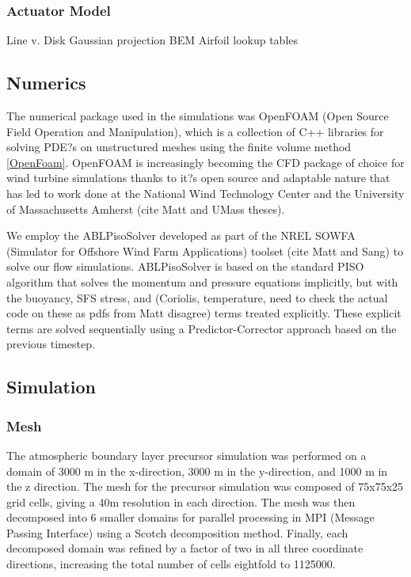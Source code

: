 \documentclass[12pt,letterpaper]{article}
\begin{document}
\subsubsection{Actuator Model}

Line v. Disk
Gaussian projection
BEM
Airfoil lookup tables


\subsection{Numerics}


The numerical package used in the simulations was OpenFOAM (Open Source Field Operation and Manipulation), which is a collection of C++ libraries for solving PDE?s on unstructured meshes using the finite volume method \ref{OpenFoam}. OpenFOAM is increasingly becoming the CFD package of choice for wind turbine simulations thanks to it?s open source and adaptable nature that has led to work done at the National Wind Technology Center and the University of Massachusetts Amherst (cite Matt and UMass theses).  

We employ the ABLPisoSolver developed as part of the NREL SOWFA (Simulator for Offshore Wind Farm Applications) toolset (cite Matt and Sang) to solve our flow simulations.  ABLPisoSolver is based on the standard PISO algorithm that solves the momentum and pressure equations implicitly, but with the buoyancy, SFS stress, and (Coriolis, temperature, need to check the actual code on these as pdfs from Matt disagree) terms treated explicitly.  These explicit terms are solved sequentially using a Predictor-Corrector approach based on the previous timestep.  

\subsection{Simulation}


\subsubsection{Mesh}

The atmospheric boundary layer precursor simulation was performed on a domain of 3000 m in the x-direction, 3000 m in the y-direction, and 1000 m in the z direction.  The mesh for the precursor simulation was composed of 75x75x25 grid cells, giving a 40m resolution in each direction.  The mesh was then decomposed into 6 smaller domains for parallel processing in MPI (Message Passing Interface) using a Scotch decomposition method.  Finally, each decomposed domain was refined by a factor of two in all three coordinate directions, increasing the total number of cells eightfold to 1125000. 
\end{document}
